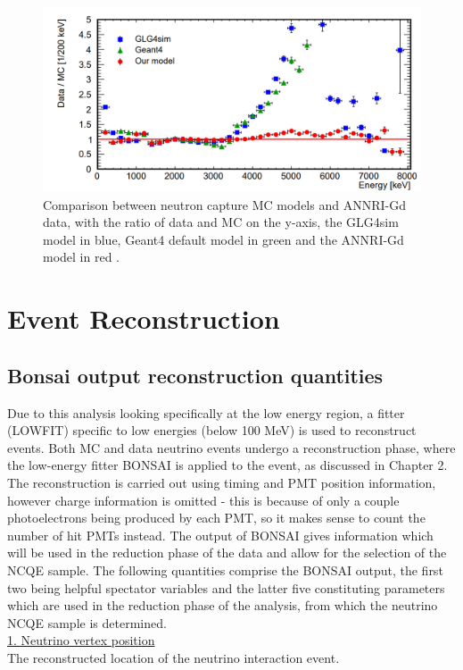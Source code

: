 \begin{figure}
\includegraphics[width=\textwidth]{Figures/annrigdmodelcompare.png}
\caption{Comparison between neutron capture MC models and ANNRI-Gd data, with the ratio of data and MC on the y-axis, the GLG4sim model in blue, Geant4 default model in green and the ANNRI-Gd model in red \cite{annri_gd_energy}.}
\label{fig:annrigdmodelcompare}
\end{figure}


\section{Event Reconstruction}
\subsection{Bonsai output reconstruction quantities}

Due to this analysis looking specifically at the low energy region, a fitter (LOWFIT) specific to low energies (below 100 MeV) is used to reconstruct events. Both MC and data neutrino events undergo a reconstruction phase, where the low-energy fitter BONSAI is applied to the event, as discussed in Chapter 2. The reconstruction is carried out using timing and PMT position information, however charge information is omitted - this is because of only a couple photoelectrons being produced by each PMT, so it makes sense to count the number of hit PMTs instead. The output of BONSAI gives information which will be used in the reduction phase of the data and allow for the selection of the NCQE sample. The following quantities comprise the BONSAI output, the first two being helpful spectator variables and the latter five constituting parameters which are used in the reduction phase of the analysis, from which the neutrino NCQE sample is determined.\\


\noindent
\underline{1. Neutrino vertex position}\\
\noindent 
The reconstructed location of the neutrino interaction event.


